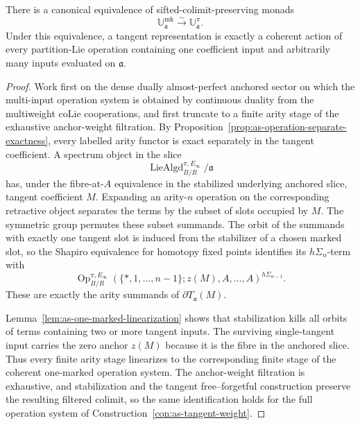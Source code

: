 \begin{theorem}
\label{thm:as-one-marked-tangent-identification}
There is a canonical equivalence of sifted-colimit-preserving monads
\[
\boxed{
    \mathbb U_{\mathfrak a}^{\mathrm{mk}}
    \xrightarrow{\sim}
    \mathbb U_{\mathfrak a}^{\pi}.
}
\]
Under this equivalence, a tangent representation is exactly a coherent action
of every partition-Lie operation containing one coefficient input and
arbitrarily many inputs evaluated on $\mathfrak a$.
\end{theorem}

\begin{proof}
Work first on the dense dually almost-perfect anchored sector on which the
multi-input operation system is obtained by continuous duality from the
multiweight coLie cooperations, and first truncate to a finite arity stage of
the exhaustive anchor-weight filtration.  By
Proposition~\ref{prop:as-operation-separate-exactness}, every labelled arity
functor is exact separately in the tangent coefficient.  A spectrum object in
the slice
\[
    \operatorname{LieAlgd}^{\pi,E_\infty}_{B/R}/\mathfrak a
\]
has, under the fibre-at-$A$ equivalence in the stabilized underlying anchored
slice, tangent coefficient $M$.  Expanding an arity-$n$ operation on the
corresponding retractive object separates the terms by the subset of slots
occupied by $M$.  The symmetric group permutes these subset summands.  The
orbit of the summands with exactly one tangent slot is induced from the
stabilizer of a chosen marked slot, so the Shapiro equivalence for homotopy
fixed points identifies its $h\Sigma_n$-term with
\[
    \operatorname{Op}^{\pi,E_\infty}_{B/R}
    \left(
        \{*,1,\ldots,n-1\};z(M),A,\ldots,A
    \right)^{h\Sigma_{n-1}}.
\]
These are exactly the arity summands of
$\partial T_{\mathfrak a}(M)$.

Lemma~\ref{lem:as-one-marked-linearization} shows that stabilization kills
all orbits of terms containing two or more tangent inputs.  The surviving
single-tangent input carries the zero anchor $z(M)$ because it is the fibre in
the anchored slice.  Thus every finite arity stage linearizes to the
corresponding finite stage of the coherent one-marked operation system.  The
anchor-weight filtration is exhaustive, and stabilization and the tangent
free--forgetful construction preserve the resulting filtered colimit, so the
same identification holds for the full operation system of
Construction~\ref{con:as-tangent-weight}.


\end{proof}
